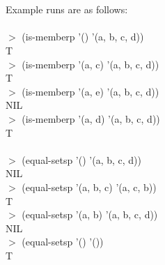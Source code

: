 \begin{enumerate}
\begin{lstlisting}
    \end{lstlisting}\\ \\
    Example runs are as follows: \\\\
    $\mathbb{>}$ (is-memberp '() '(a, b, c, d))\\
    T\\
    $\mathbb{>}$ (is-memberp '(a, c) '(a, b, c, d))\\
    T\\
    $\mathbb{>}$ (is-memberp '(a, e) '(a, b, c, d))\\
    NIL\\
    $\mathbb{>}$ (is-memberp '(a, d) '(a, b, c, d))\\
    T\\ \\
    $\mathbb{>}$ (equal-setsp '() '(a, b, c, d))\\
    NIL\\
    $\mathbb{>}$ (equal-setsp '(a, b, c) '(a, c, b))\\
    T\\
    $\mathbb{>}$ (equal-setsp '(a, b) '(a, b, c, d))\\
    NIL\\
    $\mathbb{>}$ (equal-setsp '() '())\\
    T\\
    
    
    
\end{enumerate}
